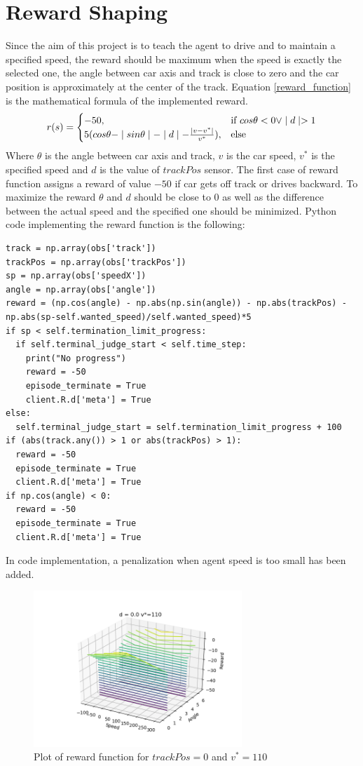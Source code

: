 \documentclass[Lau,oneside,noexaminfo]{sapthesis} %
\begin{document}
\section{Reward Shaping}
Since the aim of this project is to teach the agent to drive and to maintain a specified speed, the reward should be maximum when the speed is exactly the selected one, the angle between car axis and track is close to zero and the car position is approximately at the center of the track.
Equation \ref{reward_function} is the mathematical formula of the implemented reward.
\begin{equation}
r(s) = \begin{cases} -50, & \mbox{if } cos \theta < 0  \vee \mid d \mid > 1 \\ 5(cos\theta - \mid sin\theta \mid - \mid d \mid - {\mid v - v^*\mid \over v^*}), & \mbox{else} \end{cases}
\label{reward_function}
\end{equation}
Where $\theta$ is the angle between car axis and track, $v$ is the car speed, $v^*$ is the specified speed and $d$ is the value of $trackPos$ sensor. The first case of reward function assigns a reward of value $-50$ if car gets off track or drives backward.
To maximize the reward $\theta$ and $d$ should be close to $0$ as well as the difference between the actual speed and the specified one should be minimized.
Python code implementing the reward function is the following:
\begin{lstlisting}
track = np.array(obs['track'])
trackPos = np.array(obs['trackPos'])
sp = np.array(obs['speedX'])
angle = np.array(obs['angle'])
reward = (np.cos(angle) - np.abs(np.sin(angle)) - np.abs(trackPos) - np.abs(sp-self.wanted_speed)/self.wanted_speed)*5
if sp < self.termination_limit_progress:
  if self.terminal_judge_start < self.time_step:
    print("No progress")
    reward = -50
    episode_terminate = True
    client.R.d['meta'] = True
else:
  self.terminal_judge_start = self.termination_limit_progress + 100
if (abs(track.any()) > 1 or abs(trackPos) > 1):
  reward = -50
  episode_terminate = True
  client.R.d['meta'] = True
if np.cos(angle) < 0:
  reward = -50
  episode_terminate = True
  client.R.d['meta'] = True
\end{lstlisting}
In code implementation, a penalization when agent speed is too small has been added.
\begin{figure}[H]
  \centering
  \includegraphics[width=0.7\textwidth]{reward_plot0}
  \caption{Plot of reward function for $trackPos = 0$ and $v^*=110$}
  \label{rewardshapingplot0}
\end{figure}
\end{document}
